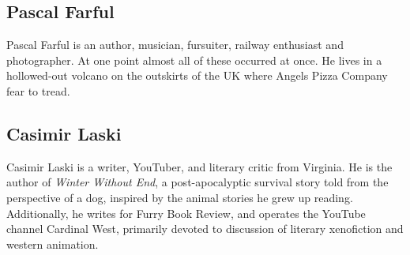 \subsection*{Pascal Farful}
Pascal Farful is an author, musician, fursuiter, railway enthusiast and photographer. At one point almost all of these occurred at once. He lives in a hollowed-out volcano on the outskirts of the UK where Angels Pizza Company fear to tread.

\subsection*{Casimir Laski}
Casimir Laski is a writer, YouTuber, and literary critic from Virginia. He is the author of \emph{Winter Without End}, a post-apocalyptic survival story told from the perspective of a dog, inspired by the animal stories he grew up reading. Additionally, he writes for Furry Book Review, and operates the YouTube channel Cardinal West, primarily devoted to discussion of literary xenofiction and western animation.
